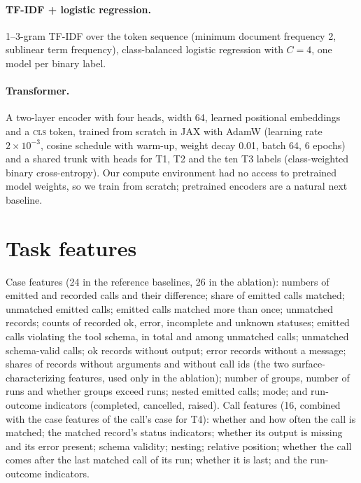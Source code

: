 \documentclass[10pt]{article}
\begin{document}
\paragraph{TF-IDF + logistic regression.} 1--3-gram TF-IDF over the token sequence (minimum document frequency 2, sublinear term frequency), class-balanced logistic regression with $C{=}4$, one model per binary label.

\paragraph{Transformer.} A two-layer encoder with four heads, width 64, learned positional embeddings and a \textsc{cls} token, trained from scratch in JAX with AdamW (learning rate $2\times10^{-3}$, cosine schedule with warm-up, weight decay 0.01, batch 64, 6 epochs) and a shared trunk with heads for T1, T2 and the ten T3 labels (class-weighted binary cross-entropy). Our compute environment had no access to pretrained model weights, so we train from scratch; pretrained encoders are a natural next baseline.

\section{Task features}
\label{app:features}
Case features (24 in the reference baselines, 26 in the ablation): numbers of emitted and recorded calls and their difference; share of emitted calls matched; unmatched emitted calls; emitted calls matched more than once; unmatched records; counts of recorded \textsf{ok}, \textsf{error}, \textsf{incomplete} and \textsf{unknown} statuses; emitted calls violating the tool schema, in total and among unmatched calls; unmatched schema-valid calls; \textsf{ok} records without output; \textsf{error} records without a message; shares of records without arguments and without call ids (the two surface-characterizing features, used only in the ablation); number of groups, number of runs and whether groups exceed runs; nested emitted calls; mode; and run-outcome indicators (completed, cancelled, raised). Call features (16, combined with the case features of the call's case for T4): whether and how often the call is matched; the matched record's status indicators; whether its output is missing and its error present; schema validity; nesting; relative position; whether the call comes after the last matched call of its run; whether it is last; and the run-outcome indicators.
\end{document}
